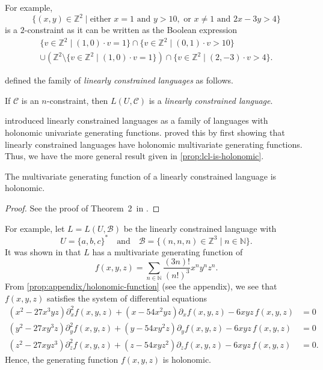 For example,
\[
	\{
		(x,y) \in \mathbb{Z}^{2}
	\mid
	\text{either }
		x = 1 \text{ and } y > 10,
	\text{ or }
		x \neq 1\text{ and }2x-3y>4
\}
\]
is a $2$-constraint as it can be written as the Boolean expression
\begin{multline*}
	\{ v \in \mathbb{Z}^{2} \mid (1,0)\cdot v = 1 \} \cap
	\{ v \in \mathbb{Z}^{2} \mid (0,1)\cdot v > 10 \}\\
	\cup
	\left(
		\mathbb{Z}^{2}\setminus
		\{ v \in \mathbb{Z}^{2} \mid (1,0)\cdot v = 1 \}
	\right)
	\cap
	\{ v \in \mathbb{Z}^{2} \mid (2,-3)\cdot v > 4 \}.
\end{multline*}

 defined the family of \emph{linearly constrained languages} as follows.

\begin{definition}\label{defn:linearly-constrained-language}
	If $\mathcal{C}$ is an $n$-constraint, then $L(U,\mathcal{C})$ is a \emph{linearly constrained language}.
\end{definition}

\Textcite{massazza1993} introduced linearly constrained languages as a family of languages with holonomic univariate generating functions.
 proved this by first showing that linearly constrained languages have holonomic multivariate generating functions.
Thus, we have the more general result given in \cref{prop:lcl-is-holonomic}.

\begin{proposition}\label{prop:lcl-is-holonomic}
	The multivariate generating function of a linearly constrained language is holonomic.
\end{proposition}

\begin{proof}
	See the proof of Theorem~2~in \cite{massazza1993}.
\end{proof}

For example, let $L = L(U,\mathcal{B})$ be the linearly constrained language with
\[
		U = \{a,b,c\}^*
	\quad
	\text{and}
	\quad
		\mathcal{B} =
		\{
			(n,n,n) \in \mathbb{Z}^3
		\mid
			n \in \mathbb{N}
		\}.
\]
It was shown in \cite[Example~2]{massazza1993} that $L$ has a multivariate generating function of
\[
	f(x,y,z)
	=
	\sum_{n \in \mathbb{N}}
	\frac{(3n)!}{(n!)^3}
	x^n y^n z^n.
\]
From \cref{prop:appendix/holonomic-function} (see the appendix), we see that $f(x,y,z)$ satisfies the system of differential equations
\begin{align*}
		(x^2 - 27 x^3 y z) \partial_x^2 f(x,y,z)
		+ (x - 54 x^2 y z) \partial_x f(x,y,z)
		- 6 x y z \, f(x,y,z)
		&= 0
	\\
		(y^2 - 27 x y^3 z) \partial_y^2 f(x,y,z)
		+ (y - 54 x y^2 z) \partial_y f(x,y,z)
		- 6 x y z \, f(x,y,z)
		&= 0
	\\
		(z^2 - 27 x y z^3) \partial_z^2 f(x,y,z)
		+ (z - 54 x y z^2) \partial_z f(x,y,z)
		- 6 x y z \, f(x,y,z)
		&= 0.
\end{align*}
Hence, the generating function $f(x,y,z)$ is holonomic.


